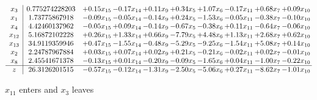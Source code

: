 \documentclass[9pt]{article}
\begin{document}
 \[\begin{array}{c| c c@{\hskip 2pt} c@{\hskip 2pt} c@{\hskip 2pt} c@{\hskip 2pt} c@{\hskip 2pt} c@{\hskip 2pt} c@{\hskip 2pt} c@{\hskip 2pt} }
 x_{3}   &  0.775274228203 & +  0.15 x_{15} & -0.17 x_{14} & +  0.11 x_{9} & +  0.34 x_{5} & +  1.07 x_{6} & -0.17 x_{11} & +  0.68 x_{7} & +  0.09 x_{10}\\
 x_{1}   &  1.73775867918 & -0.09 x_{15} & -0.05 x_{14} & -0.14 x_{9} & +  0.24 x_{5} & -1.53 x_{6} & -0.05 x_{11} & -0.38 x_{7} & -0.10 x_{10}\\
 x_{4}   &  4.42460137962 & -0.05 x_{15} & +  0.09 x_{14} & -0.14 x_{9} & -0.67 x_{5} & -0.38 x_{6} & +  0.11 x_{11} & -0.64 x_{7} & -0.06 x_{10}\\
 x_{12}   &  5.16872102228 & +  0.26 x_{15} & +  1.33 x_{14} & +  0.66 x_{9} & -7.79 x_{5} & +  4.48 x_{6} & +  1.13 x_{11} & +  2.68 x_{7} & +  0.62 x_{10}\\
 x_{13}   &  34.9119359946 & +  0.47 x_{15} & -1.55 x_{14} & -0.48 x_{9} & -5.29 x_{5} & -9.25 x_{6} & -1.54 x_{11} & +  5.08 x_{7} & +  0.14 x_{10}\\
 x_{2}   &  2.24787967884 & +  0.03 x_{15} & +  0.07 x_{14} & +  0.02 x_{9} & +  0.21 x_{5} & -0.21 x_{6} & -0.02 x_{11} & +  0.02 x_{7} & -0.01 x_{10}\\
 x_{8}   &  2.45541671378 & -0.13 x_{15} & +  0.01 x_{14} & -0.20 x_{9} & -0.09 x_{5} & -1.65 x_{6} & +  0.04 x_{11} & -1.00 x_{7} & -0.22 x_{10}\\
\hline
z    &  26.3126201515 & -0.57 x_{15} & -0.12 x_{14} & -1.31 x_{9} & -2.50 x_{5} & -5.06 x_{6} & +  0.27 x_{11} & -8.62 x_{7} & -1.01 x_{10}\\
\end{array}\]


 $ x_{11} $ enters and $ x_{3} $ leaves 
\end{document}
